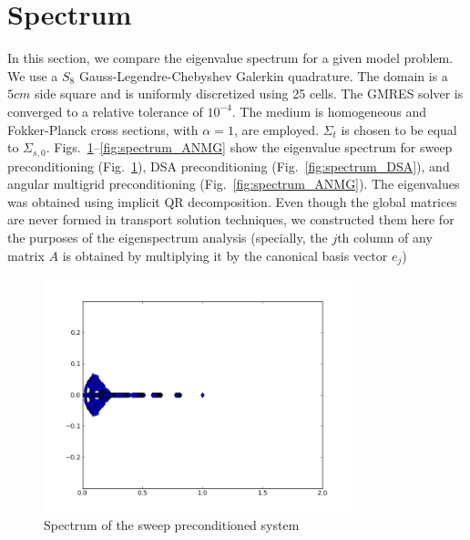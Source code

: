 \documentclass[preprint,10pt]{elsarticle}
\renewcommand{\(}{\left(}
\renewcommand{\)}{\right)}
\renewcommand{\[}{\left[}
\renewcommand{\]}{\right]}
\newcommand{\fig}[1]{Fig.~\ref{#1}}                      %
\begin{document}
\section{Spectrum} \label{sec:spectrum}
In this section, we compare the eigenvalue spectrum for a given model problem. We use a $S_8$
Gauss-Legendre-Chebyshev Galerkin quadrature. The domain is a $5cm$ side
square and is uniformly discretized using 25 cells. The GMRES solver is converged to a 
relative tolerance of $10^{-4}$. The medium is homogeneous and Fokker-Planck
cross sections, with $\alpha=1$, are employed. $\Sigma_t$ is chosen to be equal to
$\Sigma_{s,0}$. Figs.~\ref{fig:spectrum_sweep}--\ref{fig:spectrum_ANMG} show the eigenvalue spectrum
for sweep preconditioning (\fig{fig:spectrum_sweep}), DSA preconditioning (\fig{fig:spectrum_DSA}),
and angular multigrid preconditioning (\fig{fig:spectrum_ANMG}). The eigenvalues was obtained using 
implicit QR decomposition. Even though the global matrices are never formed in
transport solution techniques, we constructed them here for the purposes of the eigenspectrum analysis
(specially, the $j$th column of any matrix $A$ is obtained by multiplying it by the canonical basis vector
$e_j$)

\begin{figure}[H]
\centering
\includegraphics[width=9cm]{s8_5_5}
\caption{Spectrum of the sweep preconditioned system}
\label{fig:spectrum_sweep}
\end{figure}
\end{document}
